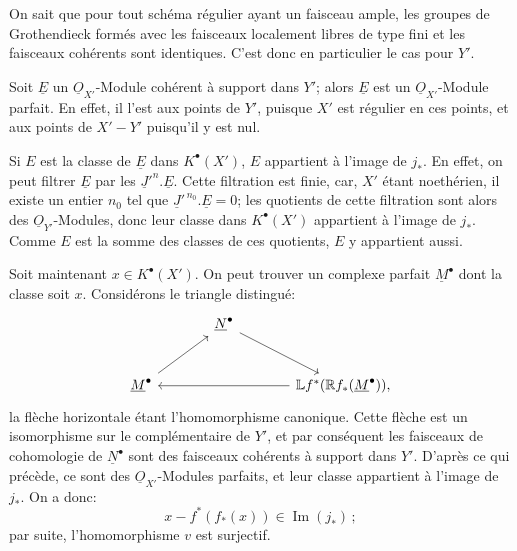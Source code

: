 
On
sait que pour tout schéma régulier ayant un faisceau ample, les groupes de Grothendieck formés avec les faisceaux localement libres de type fini et les faisceaux cohérents sont identiques. C'est donc en particulier le cas pour \(Y'\).

Soit \(\underline{E}\) un \(\underline{O}_{X'}\)-Module cohérent à support dans \(Y'\); alors \(\underline{E}\) est un \(\underline{O}_{X'}\)-Module parfait. En effet, il l'est aux points de \(Y'\), puisque \(X'\) est régulier en ces points, et aux points de \(X'-Y'\) puisqu'il y est nul.

Si \(E\) est la classe de \(\underline{E}\) dans \(K^{\bullet}(X')\), \(E\) appartient à l'image de \(j_*\). En effet, on peut filtrer \(\underline{E}\) par les \(\underline{J}'^n.\underline{E}\). Cette filtration est finie, car, \(X'\) étant noethérien, il existe un entier \(n_0\) tel que \(\underline{J}'^{\,n_0}.\underline{E}=0\); les quotients de cette filtration sont alors des \(\underline{O}_{Y'}\)-Modules, donc leur classe dans \(K^{\bullet}(X')\) appartient à l'image de \(j_*\). Comme \(E\) est la somme des classes de ces quotients, \(E\) y appartient aussi.

Soit maintenant \(x\in K^{\bullet}(X')\). On peut trouver un complexe parfait \(\underline{M}^\bullet\) dont la classe soit \(x\). Considérons le triangle distingué:
\[
\begin{tikzcd}[column sep=large,row sep=large]
& \underline{N}^\bullet \arrow[dr] &\\
\underline{M}^\bullet \arrow[ur] && \mathbb Lf^*(\mathbb Rf_*(\underline{M}^\bullet)) \arrow[ll] ,
\end{tikzcd}
\]
la flèche horizontale étant l'homomorphisme canonique. Cette flèche est un isomorphisme sur le complémentaire de \(Y'\), et par conséquent les faisceaux de cohomologie de \(\underline{N}^\bullet\) sont des faisceaux cohérents à support dans \(Y'\). D'après ce qui précède, ce sont des \(\underline{O}_{X'}\)-Modules parfaits, et leur classe appartient à l'image de \(j_*\). On a donc:
\[
x-f^*(f_*(x))\in\operatorname{Im}(j_*)\,;
\]
par suite, l'homomorphisme \(v\) est surjectif.



\providecommand{\Q}{\mathbb Q}
\providecommand{\bfP}{\mathbf P}
\providecommand{\gr}{\operatorname{gr}}
\providecommand{\Id}{\operatorname{Id}}
\providecommand{\Fil}{\operatorname{Fil}}
\providecommand{\Imf}{\operatorname{Im}}
\providecommand{\rank}{\operatorname{rank}}
\providecommand{\codim}{\operatorname{codim}}
\providecommand{\cJ}{\mathcal J}
\providecommand{\cI}{\mathcal I}
\providecommand{\cN}{\mathcal N}
\providecommand{\cE}{\mathcal E}
\providecommand{\cO}{\mathcal O}


